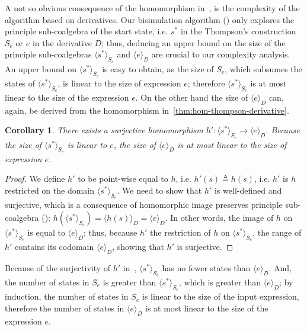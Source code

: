 \documentclass[conference]{IEEEtran}
\newtheorem{corollary}[theorem]{Corollary}
\begin{document}
A not so obvious consequence of the homomorphism in~, is the complexity of the algorithm based on derivatives.
Our bisimulation algorithm () only explores the principle sub-coalgebra of the start state, i.e. \(s^*\) in the Thompson's construction \(Ŝ_{e}\) or \(e\) in the derivative \(D̂\); thus, deducing an upper bound on the size of the principle sub-coalgebras \(⟨s^*⟩_{Ŝ_{e}}\) and \(⟨e⟩_{D̂}\) are crucial to our complexity analysis.
An upper bound on \(⟨s^*⟩_{Ŝ_{e}}\) is easy to obtain, as the size of \(Ŝ_{e}\), which subsumes the states of \(⟨s^*⟩_{Ŝ_{e}}\), is linear to the size of expression \(e\); therefore \(⟨s^*⟩_{Ŝ_{e}}\) is at most linear to the size of the expression \(e\).
On the other hand the size of \(⟨e⟩_{D̂}\) can, again, be derived from the homomorphism in~\cref{thm:hom-thompson-derivative}.

\begin{corollary}\label{thm:suj-hom-thompson-derivative}
    There exists a surjective homomorphism \(h': ⟨s^*⟩_{Ŝ_{e}} → ⟨e⟩_{D̂}\). 
    Because the size of \(⟨s^*⟩_{Ŝ_{e}}\) is linear to \(e\), the size of \(⟨e⟩_{D̂}\) is at most linear to the size of expression \(e\).
\end{corollary}

\begin{proof}
    We define \(h'\) to be point-wise equal to \(h\), i.e. \(h'(s) ≜ h(s)\), i.e. \(h'\) is \(h\) restricted on the domain \(⟨s^*⟩_{Ŝ_{e}}\). 
    We need to show that \(h'\) is well-defined and surjective, which is a consequence of homomorphic image preserves principle sub-coalgebra (): \(h(⟨s^*⟩_{Ŝ_{e}}) = ⟨h(s)⟩_{D̂} = ⟨e⟩_{D̂}.\)
    In other words, the image of \(h\) on \(⟨s^*⟩_{Ŝ_{e}}\) is equal to \(⟨e⟩_{D̂}\); thus, because \(h'\) the restriction of \(h\) on \(⟨s^*⟩_{Ŝ_{e}}\), the range of \(h'\) contains its codomain \(⟨e⟩_{D̂}\), showing that \(h'\) is surjective.
\end{proof}

Because of the surjectivity of \(h'\) in~, \(⟨s^*⟩_{Ŝ_{e}}\) has no fewer states than \(⟨e⟩_{D̂}\).
And, the number of states in \(Ŝ_{e}\) is greater than \(⟨s^*⟩_{Ŝ_{e}}\), which is greater than \(⟨e⟩_{D̂}\); by induction, the number of states in \(Ŝ_{e}\) is linear to the size of the input expression, therefore the number of states in \(⟨e⟩_{D̂}\) is at most linear to the size of the expression \(e\). 
\end{document}
